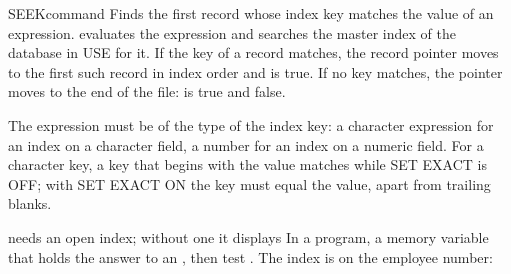 \begin{XbaseEntry}{SEEK}{command}
Finds the first record whose index key matches the value of an expression.
\Syntax
{}
\Usage
{} evaluates the expression and searches the master index of the
database in USE for it.  If the key of a record matches, the record pointer
moves to the first such record in index order and  is true.  If
no key matches, the pointer moves to the end of the file:  is true
and  false.

The expression must be of the type of the index key: a character expression
for an index on a character field, a number for an index on a numeric field.
For a character key, a key that begins with the value matches while SET EXACT
is OFF; with SET EXACT ON the key must equal the value, apart from trailing
blanks.

 needs an open index; without one it displays
\Tips
In a program,  a memory variable that holds the answer to an
, then test .
\Examples
{}
The index  is on the employee number:
\end{XbaseEntry}

